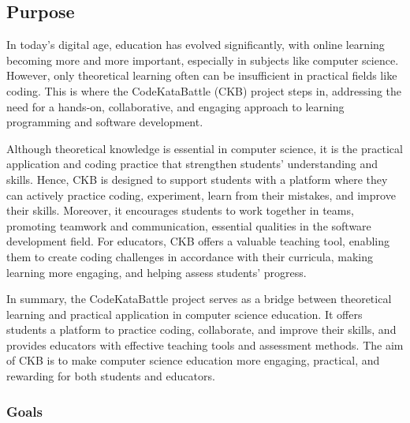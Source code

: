 
\subsection{Purpose}
In today's digital age, education has evolved significantly, with online learning becoming more and more important, especially in subjects like computer science. However, only theoretical learning often can be insufficient in practical fields like coding. This is where the CodeKataBattle (CKB) project steps in, addressing the need for a hands-on, collaborative, and engaging approach to learning programming and software development.


Although theoretical knowledge is essential in computer science, it is the practical application and coding practice that strengthen students' understanding and skills. Hence, CKB is designed to support students with a platform where they can actively practice coding, experiment, learn from their mistakes, and improve their skills. Moreover, it encourages students to work together in teams, promoting teamwork and communication, essential qualities in the software development field. For educators, CKB offers a valuable teaching tool, enabling them to create coding challenges in accordance with their curricula, making learning more engaging, and helping assess students' progress.


In summary, the CodeKataBattle project serves as a bridge between theoretical learning and practical application in computer science education. It offers students a platform to practice coding, collaborate, and improve their skills, and provides educators with effective teaching tools and assessment methods. The aim of CKB is to make computer science education more engaging, practical, and rewarding for both students and educators.

\subsubsection{Goals}

